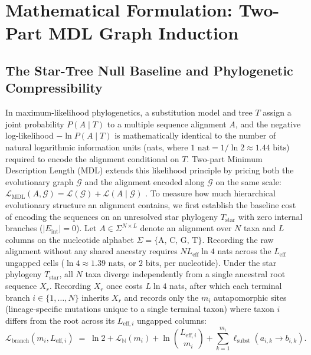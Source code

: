 \documentclass[11pt,a4paper]{article}
\begin{document}
\section{Mathematical Formulation: Two-Part MDL Graph Induction}

\subsection{The Star-Tree Null Baseline and Phylogenetic Compressibility}

In maximum-likelihood phylogenetics, a substitution model and tree $T$ assign a joint probability $P(A \mid T)$ to a multiple sequence alignment $A$, and the negative log-likelihood $-\ln P(A \mid T)$ is mathematically identical to the number of natural logarithmic information units (nats, where $1\text{ nat} = 1/\ln 2 \approx 1.44\text{ bits}$) required to encode the alignment conditional on $T$. Two-part Minimum Description Length (MDL) extends this likelihood principle by pricing both the evolutionary graph $\mathcal{G}$ and the alignment encoded along $\mathcal{G}$ on the same scale: $\mathcal{L}_{\text{MDL}}(A, \mathcal{G}) = \mathcal{L}(\mathcal{G}) + \mathcal{L}(A \mid \mathcal{G})$ \citep{rissanen1978modeling,rissanen1983universal}. To measure how much hierarchical evolutionary structure an alignment contains, we first establish the baseline cost of encoding the sequences on an unresolved star phylogeny $T_{\text{star}}$ with zero internal branches ($|E_{\text{int}}| = 0$). Let $A \in \Sigma^{N \times L}$ denote an alignment over $N$ taxa and $L$ columns on the nucleotide alphabet $\Sigma = \{\text{A, C, G, T}\}$. Recording the raw alignment without any shared ancestry requires $N L_{\text{eff}} \ln 4$ nats across the $L_{\text{eff}}$ ungapped cells ($\ln 4 \approx 1.39\text{ nats}$, or $2\text{ bits}$, per nucleotide). Under the star phylogeny $T_{\text{star}}$, all $N$ taxa diverge independently from a single ancestral root sequence $X_r$. Recording $X_r$ once costs $L \ln 4$ nats, after which each terminal branch $i \in \{1, \dots, N\}$ inherits $X_r$ and records only the $m_i$ autapomorphic sites (lineage-specific mutations unique to a single terminal taxon) where taxon $i$ differs from the root across its $L_{\text{eff}, i}$ ungapped columns:
\begin{equation}
    \mathcal{L}_{\text{branch}}(m_i, L_{\text{eff}, i}) \;=\; \ln 2 + \mathcal{L}_{\mathbb{N}}(m_i) + \ln\binom{L_{\text{eff}, i}}{m_i} + \sum_{k=1}^{m_i} \ell_{\text{subst}}(a_{i,k} \to b_{i,k}).
    \label{eq:branch_code}
\end{equation}
\end{document}
